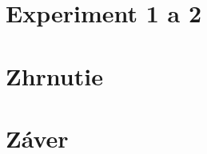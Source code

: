 \documentclass[10pt,twoside,slovak,a4paper]{article}
\begin{document}
\section{Experiment 1 a 2} \label{experiment}




\section{Zhrnutie} \label{zhrnutie}




\section{Záver} \label{zaver} %






\end{document}
